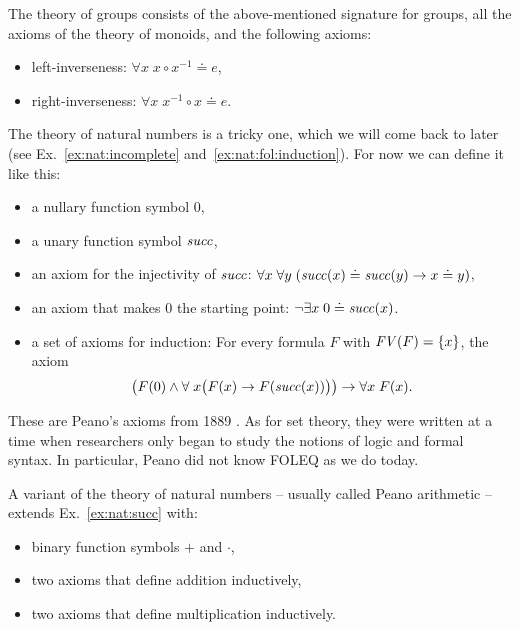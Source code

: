 \begin{example}[Groups]\label{ex:group}
The theory of groups consists of the above-mentioned signature for groups, all the axioms of the theory of monoids, and the following axioms:
\begin{itemize}
\item left-inverseness: $\forall x\;x\circ x^{-1} \doteq e$,
\item right-inverseness: $\forall x\;x^{-1}\circ x \doteq e$.
\end{itemize}
\end{example}

\begin{example}\label{ex:nat:succ}
The theory of natural numbers is a tricky one, which we will come back to later (see Ex.~\ref{ex:nat:incomplete} and~\ref{ex:nat:fol:induction}). For now we can define it like this:
\begin{itemize}
\item a nullary function symbol $0$,
\item a unary function symbol $\mathit{succ}$,
\item an axiom for the injectivity of $\mathit{succ}$: $\forall x\;\forall y\;(\mathit{succ}(x)\doteq\mathit{succ}(y)\rightarrow x\doteq y)$,
\item an axiom that makes $0$ the starting point: $\neg\exists x\;0\doteq\mathit{succ}(x)$.
\item a set of axioms for induction: For every formula $F$ with $\mathit{FV}(F)=\{x\}$, the axiom
 \[\big(F(0) \wedge \forall\;x \big(F(x)\rightarrow F(\mathit{succ}(x))\big)\big)\rightarrow\forall x\; F(x).\]
\end{itemize}
These are Peano's axioms from 1889 \cite{peanoaxioms}. As for set theory, they were written at a time when researchers only began to study the notions of logic and formal syntax. In particular, Peano did not know FOLEQ as we do today.
\end{example}

\begin{example}\label{ex:nat:arith}
A variant of the theory of natural numbers -- usually called Peano arithmetic -- extends Ex.~\ref{ex:nat:succ} with:
\begin{itemize}
\item binary function symbols $+$ and $\cdot$,
\item two axioms that define addition inductively,
\item two axioms that define multiplication inductively.
\end{itemize}
\end{example}


